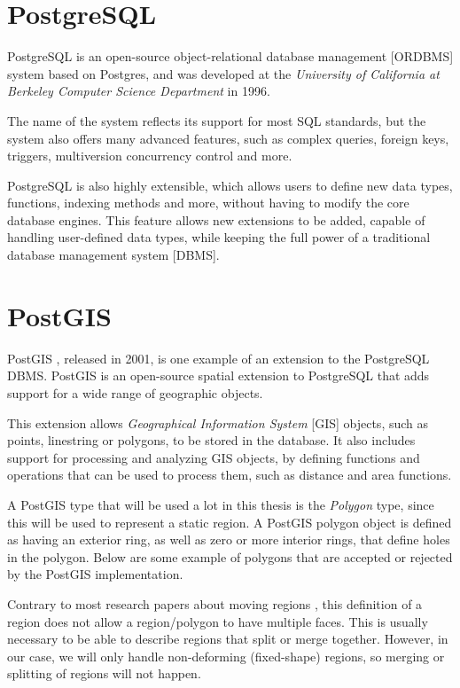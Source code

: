 \section{PostgreSQL}

PostgreSQL  is an open-source object-relational database management [ORDBMS] system based on Postgres, and was developed at the \textit{University of California at  Berkeley Computer Science Department} in 1996.

The name of the system reflects its support for most SQL standards, but the system also offers many advanced features, such as complex queries, foreign keys, triggers, multiversion concurrency control and more. 

PostgreSQL is also highly extensible, which allows users to define new data types, functions, indexing methods and more, without having to modify the core database engines. This feature allows new extensions to be added, capable of handling user-defined data types, while keeping the full power of a traditional database management system [DBMS].

\section{PostGIS}

PostGIS , released in 2001, is one example of an extension to the PostgreSQL DBMS. PostGIS is an open-source spatial extension to PostgreSQL that adds support for a wide range of geographic objects. 

This extension allows \textit{Geographical Information System} [GIS] objects, such as points, linestring or polygons, to be stored in the database. It also includes support for processing and analyzing GIS objects, by defining functions and operations that can be used to process them, such as distance and area functions.

A PostGIS type that will be used a lot in this thesis is the \textit{Polygon} type, since this will be used to represent a static region. A PostGIS polygon object is defined as having an exterior ring, as well as zero or more interior rings, that define holes in the polygon. Below are some example of polygons that are accepted or rejected by the PostGIS implementation.


Contrary to most research papers about moving regions , this definition of a region does not allow a region/polygon to have multiple faces. This is usually necessary to be able to describe regions that split or merge together. However, in our case, we will only handle non-deforming (fixed-shape) regions, so merging or splitting of regions will not happen.

